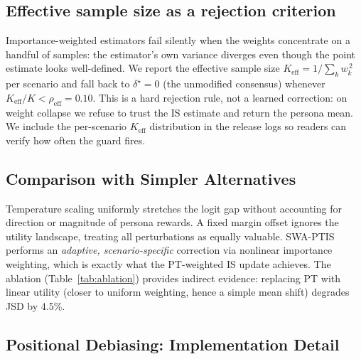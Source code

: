 \documentclass{article}
\begin{document}
\subsection{Effective sample size as a rejection criterion}
\label{app:is_theory:keff}
Importance-weighted estimators fail silently when the weights concentrate on
a handful of samples: the estimator's own variance diverges even though the
point estimate looks well-defined. We report the effective sample size
$K_{\text{eff}}=1/\sum_k w_k^{\,2}$ per scenario and fall back to
$\delta^{\star}=0$ (the unmodified consensus) whenever
$K_{\text{eff}}/K<\rho_{\text{eff}}=0.10$. This is a hard rejection rule, not
a learned correction: on weight collapse we refuse to trust the IS estimate
and return the persona mean. We include the per-scenario $K_{\text{eff}}$
distribution in the release logs so readers can verify how often the guard
fires.

\subsection{Comparison with Simpler Alternatives}

Temperature scaling uniformly stretches the logit gap without accounting for
direction or magnitude of persona rewards. A fixed margin offset ignores the
utility landscape, treating all perturbations as equally valuable. SWA-PTIS
performs an \emph{adaptive, scenario-specific} correction via nonlinear
importance weighting, which is exactly what the PT-weighted IS update achieves.
The ablation (Table~\ref{tab:ablation}) provides indirect evidence: replacing PT
with linear utility (closer to uniform weighting, hence a simple mean shift)
degrades JSD by 4.5\%.

\subsection{Positional Debiasing: Implementation Detail}
\label{app:debias_impl}
\end{document}
